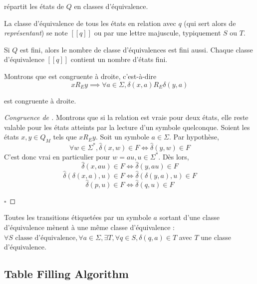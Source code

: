 \begin{corollary}
 \re répartit les états de $Q$ en classes d'équivalence.
\end{corollary}

La classe d'équivalence de tous les états en relation \re avec $q$ (qui sert alors de \emph{représentant}) se note $[[q]]$ ou par une lettre majuscule, typiquement $S$ ou $T$.

\begin{corollary}\label{col:qclasses}
  Si $Q$ est fini, alors le nombre de classe d'équivalences est fini aussi. Chaque classe d'équivalence $[[q]]$ contient un nombre d'états fini.
\end{corollary}

Montrons que \re est congruente à droite, c'est-à-dire
$$
xR_Ey \implies \forall a \in \Sigma, \delta(x,a)R_E\delta(y,a)
$$

\begin{proposition}[Congruence de \re]
 \re est congruente à droite.
\end{proposition}

\begin{proof}[Congruence de \re]\label{proof:rmcongruency}
 Montrons que si la relation est vraie pour deux états, elle reste valable pour les états atteints par la lecture d'un symbole quelconque. Soient les états $x,y \in Q_M$ tels que $xR_Ey$. Soit un symbole $a \in \Sigma$. Par hypothèse,
 $$\forall w \in \Sigma^*, \hat{\delta}(x, w) \in F \iff \hat{\delta}(y, w) \in F$$
 C'est donc vrai en particulier pour $w = au, u \in \Sigma^*$. Dès lors,
 $$\hat{\delta}(x, au) \in F\iff \hat{\delta}(y, au)\in F$$
 $$\hat{\delta}(\delta(x,a),u) \in F\iff\hat{\delta}(\delta(y,a),u)\in F$$
 $$\hat{\delta}(p,u) \in F\iff \hat{\delta}(q,u)\in F$$

\hfill$\square$
\end{proof}

\begin{corollary}\label{col:st}
 Toutes les transitions étiquetées par un symbole $a$ sortant d'une classe d'équivalence mènent à une même classe d'équivalence :
 $\forall S \text{ classe d'équivalence},\forall a \in \Sigma, \exists T, \forall q \in S, \delta(q,a)\in T$ avec $T$ une classe d'équivalence.
\end{corollary}



\subsection{Table Filling Algorithm}\label{ss:tfa}

